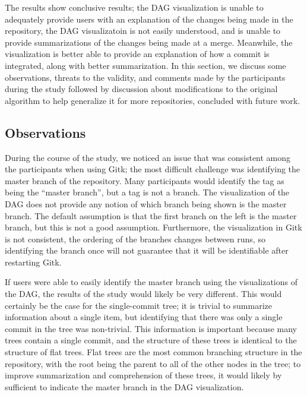 

The results show conclusive results; the DAG visualization is unable to
adequately provide users with an explanation of the changes being made
in the repository, the DAG visualizatoin is not easily understood, and
is unable to provide summarizations of the changes being made at a
merge. Meanwhile, the \mt visualization is better able to provide an
explanation of how a commit is integrated, along with better
summarization. In this section, we discuss some observations, threats to
the validity, and comments made by the participants during the study
followed by discussion about modifications to the original algorithm to
help generalize it for more repositories, concluded with future work.


\subsection{Observations}
\label{sub:observations}


During the course of the study, we noticed an issue that was consistent
among the participants when using Gitk; the most difficult challenge was
identifying the master branch of the repository. Many participants would
identify the tag as being the ``master branch'', but a tag is not a
branch. The visualization of the DAG does not provide any notion of
which branch being shown is the master branch. The default assumption is
that the first branch on the left is the master branch, but this is not
a good assumption. Furthermore, the visualization in Gitk is not
consistent, the ordering of the branches changes between runs, so
identifying the branch once will not guarantee that it will be
identifiable after restarting Gitk.

If users were able to easily identify the master branch using the
visualizations of the DAG, the results of the study would likely be very
different. This would certainly be the case for the single-commit tree;
it is trivial to summarize information about a single item, but
identifying that there was only a single commit in the tree was
non-trivial. This information is important because many trees contain a
single commit, and the structure of these trees is identical to the
structure of flat trees. Flat trees are the most common branching
structure in the repository, with the root being the parent to all of
the other nodes in the tree; to improve summarization and comprehension
of these trees, it would likely by sufficient to indicate the master
branch in the DAG visualization.

